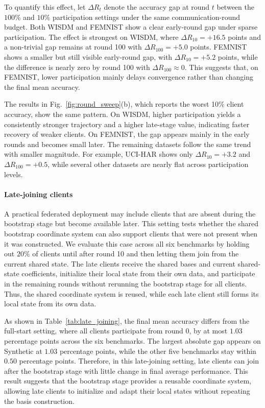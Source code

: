 \documentclass[lettersize,journal]{IEEEtran}
\newcommand{\rev}[1]{#1}
\begin{document}
To quantify this effect, let \(\Delta R_t\) denote the accuracy gap at round \(t\) between the \(100\%\) and \(10\%\) participation settings under the same communication-round budget.
Both WISDM and FEMNIST show a clear early-round gap under sparse participation.
The effect is strongest on WISDM, where \(\Delta R_{10}=+16.5\) points and a non-trivial gap remains at round 100 with \(\Delta R_{100}=+5.0\) points.
FEMNIST shows a smaller but still visible early-round gap, with \(\Delta R_{10}=+5.2\) points, while the difference is nearly zero by round 100 with \(\Delta R_{100}\approx 0\).
This suggests that, on FEMNIST, lower participation mainly delays convergence rather than changing the final mean accuracy.

The results in Fig.~\ref{fig:round_sweep}(b), which reports the worst 10\% client accuracy, show the same pattern.
On WISDM, higher participation yields a consistently stronger trajectory and a higher late-stage value, indicating faster recovery of weaker clients.
On FEMNIST, the gap appears mainly in the early rounds and becomes small later.
The remaining datasets follow the same trend with smaller magnitude.
For example, UCI-HAR shows only \(\Delta R_{10}=+3.2\) and \(\Delta R_{100}=+0.5\), while several other datasets are nearly flat across participation levels.




\paragraph{\rev{Late-joining clients}}
\rev{A practical federated deployment may include clients that are absent during the bootstrap stage but become available later.}
\rev{This setting tests whether the shared bootstrap coordinate system can also support clients that were not present when it was constructed.}
\rev{We evaluate this case across all six benchmarks by holding out \(20\%\) of clients until after round 10 and then letting them join from the current shared state.}
\rev{The late clients receive the shared bases and current shared-state coefficients, initialize their local state from their own data, and participate in the remaining rounds without rerunning the bootstrap stage for all clients.}
\rev{Thus, the shared coordinate system is reused, while each late client still forms its local state from its own data.}

\rev{As shown in Table~\ref{tab:late_joining}, the final mean accuracy differs from the full-start setting, where all clients participate from round 0, by at most \(1.03\) percentage points across the six benchmarks.}
\rev{The largest absolute gap appears on Synthetic at \(1.03\) percentage points, while the other five benchmarks stay within \(0.50\) percentage points.}
\rev{Therefore, in this late-joining setting, late clients can join after the bootstrap stage with little change in final average performance.}
\rev{This result suggests that the bootstrap stage provides a reusable coordinate system, allowing late clients to initialize and adapt their local states without repeating the basis construction.}
\end{document}
